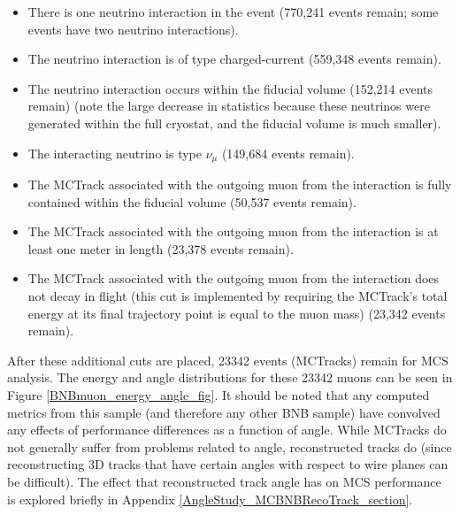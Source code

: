 \begin{itemize}
\item There is one neutrino interaction in the event (770,241 events remain; some events have two neutrino interactions).
\item The neutrino interaction is of type charged-current (559,348 events remain).
\item The neutrino interaction occurs within the fiducial volume (152,214 events remain) (note the large decrease in statistics because these neutrinos were generated within the full cryostat, and the fiducial volume is much smaller).
\item The interacting neutrino is type $\nu_\mu$ (149,684 events remain).
\item The {\sc MCTrack} associated with the outgoing muon from the interaction is fully contained within the fiducial volume (50,537 events remain).
\item The {\sc MCTrack} associated with the outgoing muon from the interaction is at least one meter in length (23,378 events remain).
\item The {\sc MCTrack} associated with the outgoing muon from the interaction does not decay in flight (this cut is implemented by requiring the {\sc MCTrack}'s total energy at its final trajectory point is equal to the muon mass) (23,342 events remain).
\end{itemize}
After these additional cuts are placed, 23342 events ({\sc MCTracks}) remain for MCS analysis. The energy and angle distributions for these 23342 muons can be seen in Figure \ref{BNBmuon_energy_angle_fig}. It should be noted that any computed metrics from this sample (and therefore any other BNB sample) have convolved any effects of performance differences as a function of angle. While {\sc MCTracks} do not generally suffer from problems related to angle, reconstructed tracks do (since reconstructing 3D tracks that have certain angles with respect to wire planes can be difficult). The effect that reconstructed track angle has on MCS performance is explored briefly in Appendix \ref{AngleStudy_MCBNBRecoTrack_section}.\\

